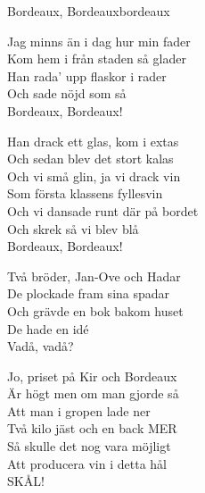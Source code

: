 \begin{song}{Bordeaux, Bordeaux}{bordeaux}
\begin{vers}
Jag minns än i dag hur min fader\\
Kom hem i från staden så glader\\
Han rada' upp flaskor i rader\\
Och sade nöjd som så\\
Bordeaux, Bordeaux!\\
\end{vers}
\begin{vers}
Han drack ett glas, kom i extas\\
Och sedan blev det stort kalas\\
Och vi små glin, ja vi drack vin\\
Som första klassens fyllesvin\\
Och vi dansade runt där på bordet\\
Och skrek så vi blev blå\\
Bordeaux, Bordeaux!\\
\end{vers}
\begin{vers}
Två bröder, Jan-Ove och Hadar\\
De plockade fram sina spadar\\
Och grävde en bok bakom huset\\
De hade en idé\\
Vadå, vadå?\\
\end{vers}
\begin{vers}
Jo, priset på Kir och Bordeaux\\
Är högt men om man gjorde så\\
Att man i gropen lade ner\\
Två kilo jäst och en back MER\\
Så skulle det nog vara möjligt\\
Att producera vin i detta hål\\
SKÅL!\\
\end{vers}
\end{song}
